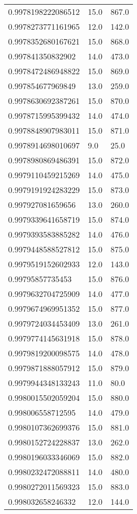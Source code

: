 \begin{center}
\begin{supertabular}[H]{p{0.30\textwidth}p{0.05\textwidth}p{0.05\textwidth}}
0.9978198222086512 & 15.0 & 867.0 \\ 
0.9978273771161965 & 12.0 & 142.0 \\ 
0.9978352680167621 & 15.0 & 868.0 \\ 
0.997841350832902 & 14.0 & 473.0 \\ 
0.9978472486948822 & 15.0 & 869.0 \\ 
0.997854677969849 & 13.0 & 259.0 \\ 
0.9978630692387261 & 15.0 & 870.0 \\ 
0.9978715995399432 & 14.0 & 474.0 \\ 
0.9978848907983011 & 15.0 & 871.0 \\ 
0.9978914698010697 & 9.0 & 25.0 \\ 
0.9978980869486391 & 15.0 & 872.0 \\ 
0.9979110459215269 & 14.0 & 475.0 \\ 
0.9979191924283229 & 15.0 & 873.0 \\ 
0.997927081659656 & 13.0 & 260.0 \\ 
0.9979339641658719 & 15.0 & 874.0 \\ 
0.9979393583885282 & 14.0 & 476.0 \\ 
0.9979448588527812 & 15.0 & 875.0 \\ 
0.9979519152602933 & 12.0 & 143.0 \\ 
0.99795857735453 & 15.0 & 876.0 \\ 
0.9979632704725909 & 14.0 & 477.0 \\ 
0.9979674969951352 & 15.0 & 877.0 \\ 
0.9979724034453409 & 13.0 & 261.0 \\ 
0.9979774145631918 & 15.0 & 878.0 \\ 
0.9979819200098575 & 14.0 & 478.0 \\ 
0.9979871888057912 & 15.0 & 879.0 \\ 
0.9979944348133243 & 11.0 & 80.0 \\ 
0.9980015502059204 & 15.0 & 880.0 \\ 
0.998006558712595 & 14.0 & 479.0 \\ 
0.9980107362699376 & 15.0 & 881.0 \\ 
0.9980152724228837 & 13.0 & 262.0 \\ 
0.9980196033346069 & 15.0 & 882.0 \\ 
0.9980232472088811 & 14.0 & 480.0 \\ 
0.9980272011569323 & 15.0 & 883.0 \\ 
0.998032658246332 & 12.0 & 144.0 \\ 

\end{supertabular}
\end{center}
